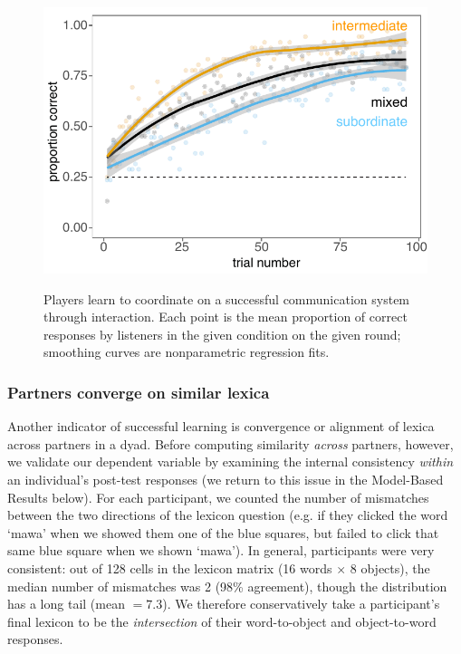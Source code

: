 \documentclass[10pt,letterpaper]{article}
\begin{document}
\begin{figure}[t]
\begin{center}
{\includegraphics[scale=0.65]{accuracyByCondition_edited.pdf}}
{\caption{\footnotesize{Players learn to coordinate on a successful communication system through interaction. Each point is the mean proportion of correct responses by listeners in the given condition on the given round; smoothing curves are nonparametric regression fits.  %
\label{fig:accuracy}}}}
\vspace{-.5cm}
\end{center}
\end{figure}

\subsubsection{Partners converge on similar lexica}

Another indicator of successful learning is convergence or alignment of lexica across partners in a dyad. Before computing similarity \emph{across} partners, however, we validate our dependent variable by examining the internal consistency \emph{within} an individual's post-test responses (we return to this issue in the Model-Based Results below). For each participant, we counted the number of mismatches between the two directions of the lexicon question (e.g. if they clicked the word `mawa' when we showed them one of the blue squares, but failed to click that same blue square when we shown `mawa'). In general, participants were very consistent: out of 128 cells in the lexicon matrix (16 words $\times$ 8 objects), the median number of mismatches was 2 (98\% agreement), though the distribution has a long tail (mean $= 7.3$). We therefore conservatively take a participant's final lexicon to be the \emph{intersection} of their word-to-object and object-to-word responses.
\end{document}
